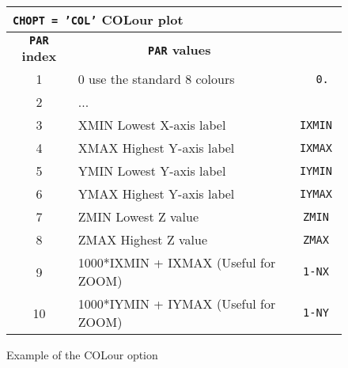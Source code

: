 \begin{figure}[p]
\begin{center}
\begin{tabular}{||c|p{}|>{\tt}r||}
\hline
\multicolumn{3}{||l||}{\bf {\tt CHOPT = 'COL'} COLour plot}    \\
\hline
\multicolumn{1}{||c|}{\bf {\tt PAR} index}           &
\multicolumn{1}{c|}{\bf {\tt PAR} values}            &
\multicolumn{1}{c||}{\bf default}                              \\
\hline
1  & 0 use the standard 8 colours                                   &   0.    \\
2  & ...                                                            &         \\
3  & XMIN Lowest X-axis label                                       &   IXMIN \\
4  & XMAX Highest Y-axis label                                      &   IXMAX \\
5  & YMIN Lowest Y-axis label                                       &   IYMIN \\
6  & YMAX Highest Y-axis label                                      &   IYMAX \\
7  & ZMIN Lowest Z value                                            &   ZMIN  \\
8  & ZMAX Highest Z value                                           &   ZMAX  \\
9  & 1000*IXMIN + IXMAX (Useful for ZOOM)                           &   1-NX  \\
10 & 1000*IYMIN + IYMAX (Useful for ZOOM)                           &   1-NY  \\
\hline
\end{tabular}
\end{center}

\bigskip

\begin{center} \mbox{} \end{center}
\caption{Example of the \protect{} COLour option}
\label{COLOUR}
\end{figure}

